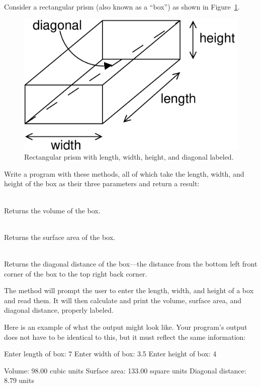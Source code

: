 \begin{exercise}
Consider a rectangular prism (also known as a ``box'') as shown in Figure~\ref{fig.rectangular-prism}.

\begin{figure}[!h]
\begin{center}
\includegraphics[scale=0.4]{figs/ch04/rectangular-prism.pdf}
\caption{Rectangular prism with length, width, height, and diagonal labeled.}
\label{fig.rectangular-prism}
\end{center}
\end{figure}

Write a program with these methods, all of which take the length, width, and height of the box as their three parameters and return a  result:

\begin{description}
\item {} \hfill \\ Returns the volume of the box.
\item {} \hfill \\ Returns the surface area of the box.
\item {} \hfill \\ Returns the diagonal distance of the box---the distance from the bottom left front corner of the box to the top right back corner.
\end{description}

The  method will prompt the user to enter the length, width, and height of a box and read them. It will then calculate and print the volume, surface area, and diagonal distance, properly labeled.

Here is an example of what the output might look like. Your program's output does not have to be identical to this, but it must reflect the same information:

\begin{stdout}
Enter length of box: 7
Enter width of box: 3.5
Enter height of box: 4

Volume: 98.00 cubic units
Surface area: 133.00 square units
Diagonal distance: 8.79 units
\end{stdout}

\end{exercise}

